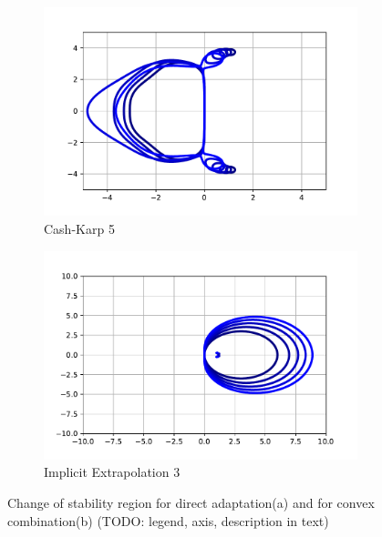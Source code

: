 \documentclass[a4paper]{scrartcl}
\numberwithin{equation}{section}
\theoremstyle{plain}
\theoremstyle{definition}
\numberwithin{theorem}{section}
\newcommand{\1}{\mathbbm{1}}
\begin{document}
\begin{figure}
     \centering
     \begin{subfigure}[b]{0.45\textwidth}
         \centering
         \includegraphics[width=\textwidth]{plots/stab_ck5.pdf}
         \caption{Cash-Karp 5}
         \label{fig:stab_ck5}
     \end{subfigure}
     \hfill
     \begin{subfigure}[b]{0.45\textwidth}
         \centering
         \includegraphics[width=\textwidth]{plots/stab_ex3.pdf}
         \caption{Implicit Extrapolation 3}
         \label{fig:stab_ex3}
     \end{subfigure}
        \caption{Change of stability region for direct adaptation(a) and for convex combination(b) (TODO: legend, axis, description in text)}
        \label{fig:stab}
\end{figure}
\end{document}
